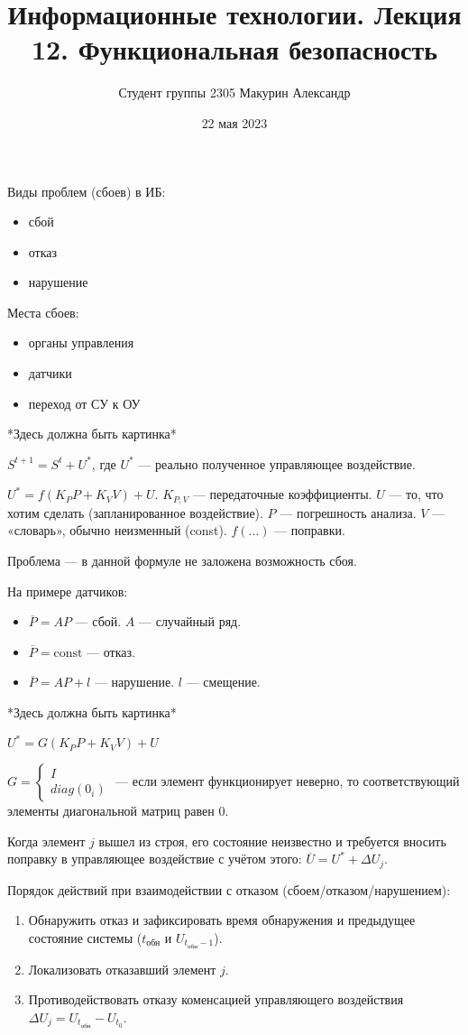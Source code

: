 \documentclass[a4paper]{article}
\title{Информационные технологии. Лекция 12. Функциональная безопасность}
\author{Студент группы 2305 Макурин Александр}
\date{22 мая 2023}
\begin{document}
\maketitle

Виды проблем (сбоев) в ИБ:
\begin{itemize}
    \item сбой
    \item отказ
    \item нарушение
\end{itemize}

Места сбоев:
\begin{itemize}
    \item органы управления
    \item датчики
    \item переход от СУ к ОУ
\end{itemize}

*Здесь должна быть картинка*

$S^{t + 1} = S^t + U^*$, где $U^*$ — реально полученное управляющее воздействие.

$U^* = f(K_PP +K_VV) + U$. $K_{P,V}$ — передаточные коэффициенты. $U$ — то, что хотим сделать (запланированное воздействие). $P$ — погрешность анализа. $V$ — «словарь», обычно неизменный (const). $f(...)$ — поправки.

Проблема — в данной формуле не заложена возможность сбоя.

На примере датчиков:
\begin{itemize}
    \item $\overline{P} = AP$ — сбой. $A$ — случайный ряд.
    \item $\overline{P} = \text{const}$ — отказ.
    \item $\overline{P} = AP + l$ — нарушение. $l$ — смещение.
\end{itemize}

*Здесь должна быть картинка*

$U^* = G(K_PP + K_VV) + U$

$G = \begin{cases}I \\ diag(0_i)\end{cases}$ — если элемент функционирует неверно, то соответствующий элементы диагональной матриц равен $0$.

Когда элемент $j$ вышел из строя, его состояние неизвестно и требуется вносить поправку в управляющее воздействие с учётом этого: $\overline{U} = U^* + \Delta U_j$.

Порядок действий при взаимодействии с отказом (сбоем/отказом/нарушением):
\begin{enumerate}
    \item Обнаружить отказ и зафиксировать время обнаружения и предыдущее состояние системы ($t_\text{обн}$ и $U_{t_\text{обн} - 1}$).
    \item Локализовать отказавший элемент $j$.
    \item Противодействовать отказу коменсацией управляющего воздействия $\Delta U_j = U_{t_\text{обн}} - U_{t_0}$.
\end{enumerate}
\end{document}
